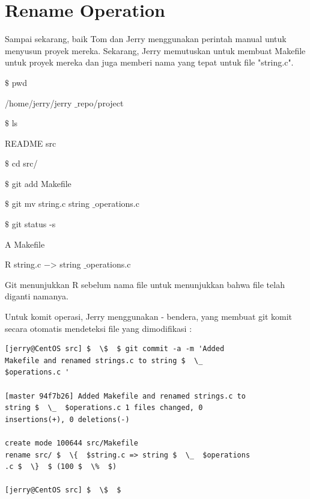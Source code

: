 \section{Rename Operation}
\hspace*{0.50in} Sampai sekarang, baik Tom dan Jerry menggunakan perintah manual untuk menyusun proyek mereka. Sekarang, Jerry memutuskan untuk membuat Makefile untuk proyek mereka dan juga memberi nama yang tepat untuk file "string.c". \par
\noindent 
{\fontsize{10pt}{10pt} $  \$  $ pwd} \par
\noindent 
{\fontsize{10pt}{10pt}\selectfont /home/jerry/jerry $  \_  $repo/project} \par
\noindent 
\vspace{10pt}
\noindent 
{\fontsize{10pt}{10pt} $  \$  $ ls} \par
\noindent 
{\fontsize{10pt}{10pt}\selectfont README src} \par
\noindent 
\vspace{10pt}
\noindent 
{\fontsize{10pt}{10pt} $  \$  $ cd src/} \par
\noindent 
\vspace{10pt}
\noindent 
{\fontsize{10pt}{10pt} $  \$  $ git add Makefile} \par
\noindent 
\vspace{10pt}
\noindent 
{\fontsize{10pt}{10pt} $  \$  $ git mv string.c string $  \_  $operations.c} \par
\noindent 
\vspace{10pt}
\noindent 
{\fontsize{10pt}{10pt} $  \$  $ git status -s} \par
\noindent 
{\fontsize{10pt}{10pt}\selectfont A Makefile} \par
\noindent 
{\fontsize{10pt}{10pt}\selectfont R string.c  $ - $> string $  \_  $operations.c} \par
\vspace{12pt}
\hspace*{0.50in}Git menunjukkan R sebelum nama file untuk menunjukkan bahwa file telah diganti namanya. \par
\hspace*{0.50in}Untuk komit operasi, Jerry menggunakan - bendera, yang membuat git komit secara otomatis mendeteksi file yang dimodifikasi : \par
\begin{verbatim}
[jerry@CentOS src] $  \$  $ git commit -a -m 'Added 
Makefile and renamed strings.c to string $  \_  
$operations.c ' 

[master 94f7b26] Added Makefile and renamed strings.c to
string $  \_  $operations.c 1 files changed, 0 
insertions(+), 0 deletions(-) 

create mode 100644 src/Makefile 
rename src/ $  \{  $string.c => string $  \_  $operations
.c $  \}  $ (100 $  \%  $)

[jerry@CentOS src] $  \$  $ 
\end{verbatim}


